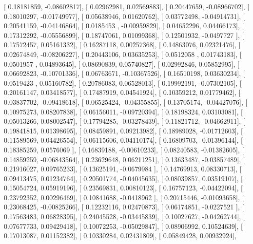 \documentclass{article}
\begin{document}
       [ 0.18181859, -0.08602817],
       [ 0.02962981,  0.02569883],
       [ 0.20447659, -0.08966702],
       [ 0.18010297, -0.01749977],
       [ 0.05638946,  0.01620762],
       [ 0.03772498, -0.04914731],
       [ 0.20541159, -0.04146864],
       [ 0.0185453 , -0.00959829],
       [ 0.04652296,  0.04466173],
       [ 0.17312292, -0.05556899],
       [ 0.18747061,  0.01099368],
       [ 0.12501932, -0.0497727 ],
       [ 0.17572457,  0.05161332],
       [ 0.16287118,  0.00257368],
       [ 0.14863076,  0.02321476],
       [ 0.02674849, -0.08206227],
       [ 0.20443106,  0.03635253],
       [ 0.0512058 ,  0.01743183],
       [ 0.0501957 ,  0.04893645],
       [ 0.08690839,  0.05740827],
       [ 0.02992846,  0.05852995],
       [ 0.06692823, -0.10701336],
       [ 0.06763671, -0.10367526],
       [ 0.16510198,  0.03630234],
       [ 0.0519423 ,  0.05160782],
       [ 0.20786083,  0.06528013],
       [ 0.19992191, -0.07302105],
       [ 0.20161147,  0.03418577],
       [ 0.17487919,  0.04541924],
       [ 0.10359212,  0.01779462],
       [ 0.03837702, -0.09418618],
       [ 0.06525424, -0.04355855],
       [ 0.13705174, -0.04427076],
       [ 0.10975273,  0.08207838],
       [ 0.06156011, -0.09720394],
       [ 0.18198324,  0.03103081],
       [ 0.05013266,  0.08002547],
       [ 0.17794285, -0.03278439],
       [ 0.11821712, -0.04662911],
       [ 0.19841815,  0.01398695],
       [ 0.08459891,  0.09213982],
       [ 0.18989028, -0.01712603],
       [ 0.11589569,  0.04426554],
       [ 0.06115606,  0.04110174],
       [ 0.16809703, -0.01396144],
       [ 0.18385259,  0.0576069 ],
       [ 0.16839188, -0.00610233],
       [ 0.08240583, -0.01382605],
       [ 0.14859259, -0.06843564],
       [ 0.23629648,  0.06211251],
       [ 0.13633487, -0.03857489],
       [ 0.21916027,  0.09765233],
       [ 0.13625191, -0.0679984 ],
       [ 0.14769913,  0.08330713],
       [ 0.09413475,  0.01234764],
       [ 0.20501774, -0.04045635],
       [ 0.08039857,  0.03519107],
       [ 0.15054724,  0.05919196],
       [ 0.23569831,  0.00810123],
       [ 0.16757123, -0.04422094],
       [ 0.23792352,  0.00296469],
       [ 0.10841688, -0.0418962 ],
       [ 0.20715446, -0.01093658],
       [ 0.23068425, -0.00825266],
       [ 0.12232116,  0.02470873],
       [ 0.06174851, -0.0227521 ],
       [ 0.17563483,  0.06828395],
       [ 0.24045528, -0.03445839],
       [ 0.10027627, -0.04262744],
       [ 0.07677733,  0.09429418],
       [ 0.10072253, -0.05029847],
       [ 0.08906992,  0.10524639],
       [ 0.17013087,  0.01152382],
       [ 0.10330284,  0.02431809],
       [ 0.05849428,  0.00932924],
\end{document}
